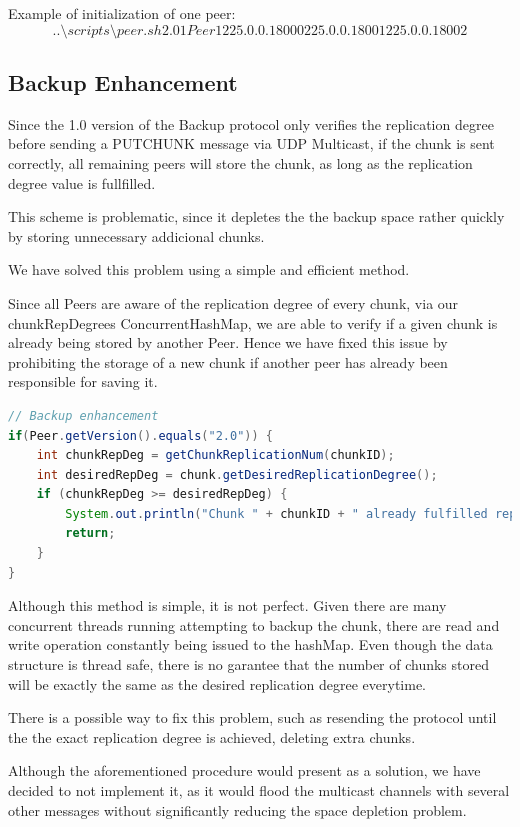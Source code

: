 \documentclass[11pt]{article}
\begin{document}
Example of initialization of one peer:
\[..\setminus scripts\setminus peer.sh 2.0 1 Peer1 225.0.0.1 8000 225.0.0.1 8001 225.0.0.1 8002\]

\subsection{Backup Enhancement}
Since the 1.0 version of the Backup protocol only verifies the replication degree before sending a PUTCHUNK message via UDP Multicast, if the chunk is sent correctly,
all remaining peers will store the chunk, as long as the replication degree value is fullfilled.

This scheme is problematic, since it depletes the the backup space rather quickly by storing unnecessary addicional chunks.

We have solved this problem using a simple and efficient method.

Since all Peers are aware of the replication degree of every chunk, via our chunkRepDegrees ConcurrentHashMap, we are able to verify if a given chunk is already being stored
by another Peer. Hence we have fixed this issue by prohibiting the storage of a new chunk if another peer has already been responsible for saving it.

\begin{lstlisting}[language=java]
// Backup enhancement
if(Peer.getVersion().equals("2.0")) {
	int chunkRepDeg = getChunkReplicationNum(chunkID);
	int desiredRepDeg = chunk.getDesiredReplicationDegree();
	if (chunkRepDeg >= desiredRepDeg) {
		System.out.println("Chunk " + chunkID + " already fulfilled repDegree. Ignoring chunk...");
		return;
	}
}
\end{lstlisting}

Although this method is simple, it is not perfect.
Given there are many concurrent threads running attempting to backup the chunk, there are read and write operation constantly being issued to the hashMap.
Even though the data structure is thread safe, there is no garantee that the number of chunks stored will be exactly the same as the desired replication degree everytime.

There is a possible way to fix this problem, such as resending the protocol until the the exact replication degree is achieved, deleting extra chunks.

Although the aforementioned procedure would present as a solution, we have decided to not implement it, 
as it would flood the multicast channels with several other messages without significantly reducing the space depletion problem.
\end{document}
